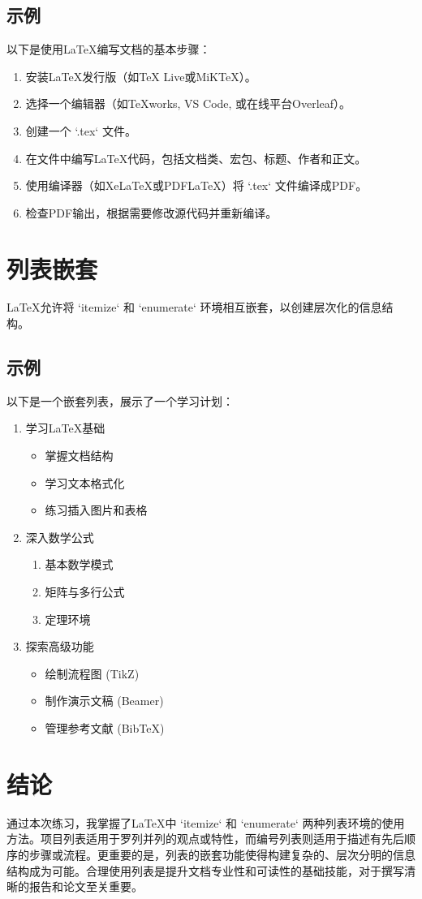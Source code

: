 \documentclass{article}
\begin{document}
\subsection{示例}
以下是使用LaTeX编写文档的基本步骤：

\begin{enumerate}
    \item 安装LaTeX发行版（如TeX Live或MiKTeX）。
    \item 选择一个编辑器（如TeXworks, VS Code, 或在线平台Overleaf）。
    \item 创建一个 `.tex` 文件。
    \item 在文件中编写LaTeX代码，包括文档类、宏包、标题、作者和正文。
    \item 使用编译器（如XeLaTeX或PDFLaTeX）将 `.tex` 文件编译成PDF。
    \item 检查PDF输出，根据需要修改源代码并重新编译。
\end{enumerate}

\section{列表嵌套}
LaTeX允许将 `itemize` 和 `enumerate` 环境相互嵌套，以创建层次化的信息结构。

\subsection{示例}
以下是一个嵌套列表，展示了一个学习计划：

\begin{enumerate}
    \item 学习LaTeX基础
        \begin{itemize}
            \item 掌握文档结构
            \item 学习文本格式化
            \item 练习插入图片和表格
        \end{itemize}
    \item 深入数学公式
        \begin{enumerate}
            \item 基本数学模式
            \item 矩阵与多行公式
            \item 定理环境
        \end{enumerate}
    \item 探索高级功能
        \begin{itemize}
            \item 绘制流程图 (TikZ)
            \item 制作演示文稿 (Beamer)
            \item 管理参考文献 (BibTeX)
        \end{itemize}
\end{enumerate}

\section{结论}
通过本次练习，我掌握了LaTeX中 `itemize` 和 `enumerate` 两种列表环境的使用方法。项目列表适用于罗列并列的观点或特性，而编号列表则适用于描述有先后顺序的步骤或流程。更重要的是，列表的嵌套功能使得构建复杂的、层次分明的信息结构成为可能。合理使用列表是提升文档专业性和可读性的基础技能，对于撰写清晰的报告和论文至关重要。
\end{document}
